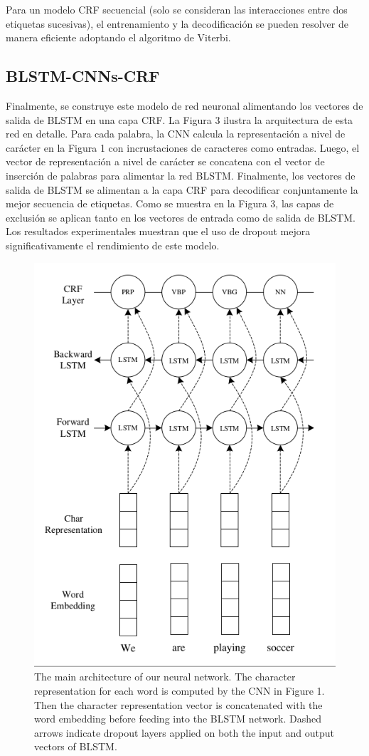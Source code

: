 \documentclass[runningheads]{llncs}
\begin{document}
Para un modelo CRF secuencial (solo se consideran las interacciones entre dos etiquetas sucesivas),
el entrenamiento y la decodificación se pueden resolver de manera eficiente adoptando el algoritmo 
de Viterbi.

\subsection{BLSTM-CNNs-CRF}
	
Finalmente, se construye este modelo de red neuronal alimentando los vectores de salida de BLSTM 
en una capa CRF. La Figura 3 ilustra la arquitectura de esta red en detalle. Para cada palabra, 
la CNN calcula la representación a nivel de carácter en la Figura 1 con incrustaciones de caracteres 
como entradas. Luego, el vector de representación a nivel de carácter se concatena con el vector de 
inserción de palabras para alimentar la red BLSTM. Finalmente, los vectores de salida de BLSTM se 
alimentan a la capa CRF para decodificar conjuntamente la mejor secuencia de etiquetas. Como se 
muestra en la Figura 3, las capas de exclusión se aplican tanto en los vectores de entrada como 
de salida de BLSTM. Los resultados experimentales muestran que el uso de dropout mejora 
significativamente el rendimiento de este modelo.

\begin{figure}
	\centering
	\includegraphics[width=12cm]{Fig_3.png}
	\caption{  The main architecture of our neural
		network. The character representation for each
		word is computed by the CNN in Figure 1. Then
		the character representation vector is concatenated
		with the word embedding before feeding into the
		BLSTM network. Dashed arrows indicate dropout
		layers applied on both the input and output vectors
		of BLSTM.}
	\label{F3}
\end{figure}
\end{document}
